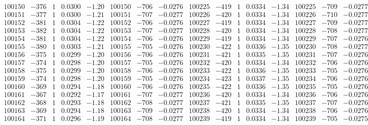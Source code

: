 \documentclass[11pt,reqno,a4letter]{article}
\numberwithin{figure}{section}
\numberwithin{table}{section}
\theoremstyle{plain}
\numberwithin{theorem}{section}
\theoremstyle{definition}
\begin{document}
\begin{table}[ht!]
\begin{equation*}
{\begin{array}{ccccc|ccc||ccccc|ccc}
100150 & -376 & 1 & 0.0300 & -1.20 & 100150 & -706 & -0.0276 & 100225 & -419 & 1 & 0.0334 & -1.34 & 100225 & -709 & -0.0277  \\
100151 & -377 & 1 & 0.0300 & -1.21 & 100151 & -707 & -0.0277 & 100226 & -420 & 1 & 0.0334 & -1.34 & 100226 & -710 & -0.0277  \\
100152 & -381 & 1 & 0.0304 & -1.22 & 100152 & -706 & -0.0276 & 100227 & -419 & 1 & 0.0334 & -1.34 & 100227 & -709 & -0.0277  \\
100153 & -382 & 1 & 0.0304 & -1.22 & 100153 & -707 & -0.0277 & 100228 & -420 & 1 & 0.0334 & -1.34 & 100228 & -708 & -0.0277  \\
100154 & -381 & 1 & 0.0304 & -1.22 & 100154 & -706 & -0.0276 & 100229 & -419 & 1 & 0.0334 & -1.34 & 100229 & -707 & -0.0276  \\
100155 & -380 & 1 & 0.0303 & -1.21 & 100155 & -705 & -0.0276 & 100230 & -422 & 1 & 0.0336 & -1.35 & 100230 & -708 & -0.0277  \\
100156 & -375 & 1 & 0.0299 & -1.20 & 100156 & -706 & -0.0276 & 100231 & -421 & 1 & 0.0335 & -1.35 & 100231 & -707 & -0.0276  \\
100157 & -374 & 1 & 0.0298 & -1.20 & 100157 & -705 & -0.0276 & 100232 & -420 & 1 & 0.0334 & -1.34 & 100232 & -706 & -0.0276  \\
100158 & -375 & 1 & 0.0299 & -1.20 & 100158 & -706 & -0.0276 & 100233 & -422 & 1 & 0.0336 & -1.35 & 100233 & -705 & -0.0276  \\
100159 & -374 & 1 & 0.0298 & -1.20 & 100159 & -705 & -0.0276 & 100234 & -423 & 1 & 0.0337 & -1.35 & 100234 & -706 & -0.0276  \\
100160 & -369 & 1 & 0.0294 & -1.18 & 100160 & -706 & -0.0276 & 100235 & -422 & 1 & 0.0336 & -1.35 & 100235 & -705 & -0.0276  \\
100161 & -367 & 1 & 0.0292 & -1.17 & 100161 & -707 & -0.0277 & 100236 & -420 & 1 & 0.0334 & -1.34 & 100236 & -706 & -0.0276  \\
100162 & -368 & 1 & 0.0293 & -1.18 & 100162 & -708 & -0.0277 & 100237 & -421 & 1 & 0.0335 & -1.35 & 100237 & -707 & -0.0276  \\
100163 & -369 & 1 & 0.0294 & -1.18 & 100163 & -709 & -0.0277 & 100238 & -420 & 1 & 0.0334 & -1.34 & 100238 & -706 & -0.0276  \\
100164 & -371 & 1 & 0.0296 & -1.19 & 100164 & -708 & -0.0277 & 100239 & -419 & 1 & 0.0334 & -1.34 & 100239 & -705 & -0.0275  \\
\end{array}
}
\end{equation*} 

\end{table}
\clearpage 
\end{document}
